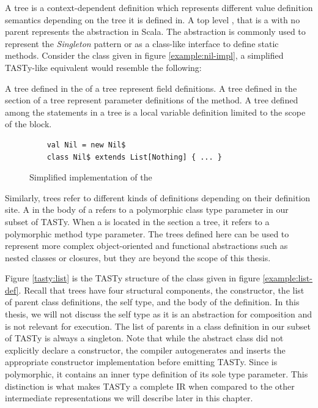 A  tree is a context-dependent definition which represents different value definition semantics depending on the tree it is defined in.
A top level , that is a  with no parent represents the  abstraction in Scala.
The  abstraction is commonly used to represent the \textit{Singleton} pattern\cite{go4:design-patterns} or as a class-like interface to define static methods.
Consider the  class given in figure \ref{example:nil-impl}, a simplified TASTy-like equivalent would resemble the following:

A  tree defined in the  of a  tree represent field definitions.
A  tree defined in the  section of a  tree represent parameter definitions of the method.
A  tree defined among the statements in a  tree is a local variable definition limited to the scope of the block.

\begin{figure}[!htb]
	\begin{verbatim}
	val Nil = new Nil$
	class Nil$ extends List[Nothing] { ... }
	\end{verbatim} 
	\caption{Simplified implementation of the }
	\label{example:decomp-object}
\end{figure}


Similarly,  trees refer to different kinds of definitions depending on their definition site.
A  in the body of a  refers to a polymorphic class type parameter in our subset of TASTy.
When a  is located in the  section a  tree, it refers to a polymorphic method type parameter.
The trees defined here can be used to represent more complex object-oriented and functional abstractions such as nested classes or closures, but they are beyond the scope of this thesis.

Figure \ref{tasty:list} is the TASTy structure of the  class given in figure \ref{example:list-def}. 
Recall that  trees have four structural components, the constructor, the list of parent class definitions, the self type, and the body of the definition.
In this thesis, we will not discuss the self type as it is an abstraction for composition\cite{gilad:mixins}\cite{scala:calculus} and is not relevant for execution.
The list of parents in a class definition in our subset of TASTy is always a singleton.
Note that while the abstract  class did not explicitly declare a constructor, the compiler autogenerates and inserts the appropriate constructor implementation before emitting TASTy.
Since  is polymorphic, it contains an inner type definition of its sole type parameter.
This distinction is what makes TASTy a complete IR when compared to the other intermediate representations we will describe later in this chapter.

